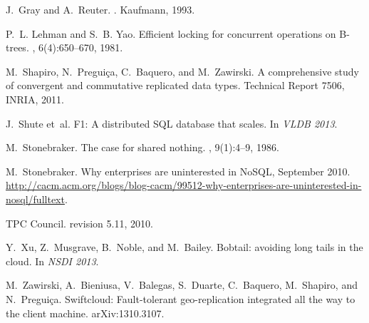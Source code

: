 \documentclass[9pt]{article}
\theoremstyle{definition}
\theoremstyle{remark}
\begin{document}
\begin{thebibliography}{10}
J.~Gray and A.~Reuter.
.
\newblock Kaufmann, 1993.

P.~L. Lehman and S.~B. Yao.
\newblock Efficient locking for concurrent operations on {B-trees}.
, 6(4):650--670,
  1981.

M.~Shapiro, N.~Pregui{\c{c}}a, C.~Baquero, and M.~Zawirski.
\newblock A comprehensive study of convergent and commutative replicated data
  types.
\newblock Technical Report 7506, INRIA, 2011.

J.~Shute et~al.
\newblock F1: A distributed {SQL} database that scales.
\newblock In {\em VLDB 2013}.

M.~Stonebraker.
\newblock The case for shared nothing.
, 9(1):4--9, 1986.

M.~Stonebraker.
\newblock Why enterprises are uninterested in {NoSQL}, September 2010.
\newblock
  \url{http://cacm.acm.org/blogs/blog-cacm/99512-why-enterprises-are-uninterested-in-nosql/fulltext}.

{TPC Council}.
 revision 5.11, 2010.

Y.~Xu, Z.~Musgrave, B.~Noble, and M.~Bailey.
\newblock Bobtail: avoiding long tails in the cloud.
\newblock In {\em NSDI 2013}.

M.~Zawirski, A.~Bieniusa, V.~Balegas, S.~Duarte, C.~Baquero, M.~Shapiro, and
  N.~Pregui{\c{c}}a.
\newblock Swiftcloud: Fault-tolerant geo-replication integrated all the way to
  the client machine.
\newblock arXiv:1310.3107.

\end{thebibliography}

\end{document}
